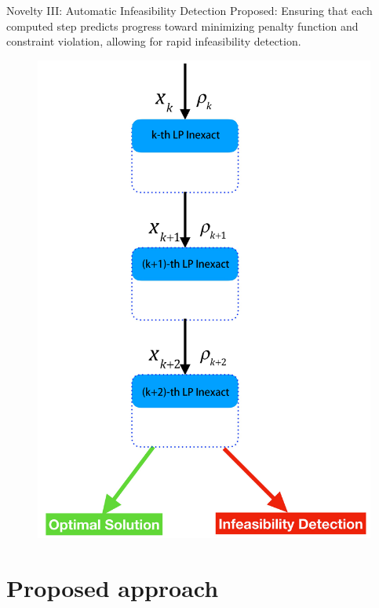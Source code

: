 \documentclass[8pt]{beamer}
\begin{document}
	\begin{frame}[c]{Novelty III: Automatic Infeasibility Detection}
		\vfill
		{\red 
		\leftpointright Proposed:} Ensuring that each computed step predicts progress toward minimizing penalty function and constraint violation,   allowing for rapid {\red infeasibility detection.}
		\vfill
		\begin{figure}[H]
			\includegraphics[height=0.8\textheight]{pic/autoInf}
		\end{figure}
	\end{frame}

	
\section{Proposed approach}
\end{document}
